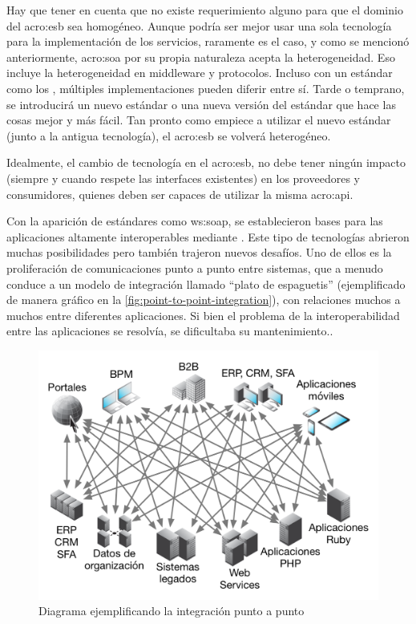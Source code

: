 Hay que tener en cuenta que no existe requerimiento alguno para que el dominio del \gls{acro:esb} sea homogéneo. Aunque podría ser mejor usar una sola tecnología para la implementación de los servicios, raramente es el caso, y como se mencionó anteriormente, \gls{acro:soa} por su propia naturaleza acepta la heterogeneidad. Eso incluye la heterogeneidad en middleware y protocolos. Incluso con un estándar como los , múltiples implementaciones pueden diferir entre sí. Tarde o temprano, se introducirá un nuevo estándar o una nueva versión del estándar que hace las cosas mejor y más fácil. Tan pronto como empiece a utilizar el nuevo estándar (junto a la antigua tecnología), el \gls{acro:esb} se volverá heterogéneo\cite[p.~49]{josuttis2007}.

Idealmente, el cambio de tecnología en el \gls{acro:esb}, no debe tener ningún impacto (siempre y cuando respete las interfaces existentes) en los proveedores y consumidores, quienes deben ser capaces de utilizar la misma \gls{acro:api}.

Con la aparición de estándares como \gls{ws:soap}, se establecieron bases para las aplicaciones altamente interoperables mediante . Este tipo de tecnologías abrieron muchas posibilidades pero también trajeron nuevos desafíos. Uno de ellos es la proliferación de comunicaciones punto a punto entre sistemas, que a menudo conduce a un modelo de integración llamado ``plato de espaguetis'' (ejemplificado de manera gráfico en la \autoref{fig:point-to-point-integration}), con relaciones muchos a muchos entre diferentes aplicaciones. Si bien el problema de la interoperabilidad entre las aplicaciones se resolvía, se dificultaba su mantenimiento.\cite[p.~4]{dossotandemic2010}.

\begin{figure}[H]
  \includegraphics[width=\linewidth]{src/images/02-capitulo-2/integracion-p2p.png}
  \caption{Diagrama ejemplificando la integración punto a punto}
  \label{fig:point-to-point-integration}
\end{figure}


